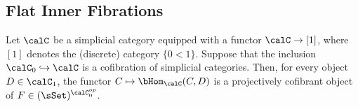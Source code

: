


\subsection{Flat Inner Fibrations}\label{flatinn}

\begin{lemma}\label{gooby}
Let $\calC$ be a simplicial category equipped with a functor
$\calC \rightarrow [1]$, where $[1]$ denotes the (discrete) category
$\{ 0 < 1 \}$. Suppose that the inclusion $\calC_0 \hookrightarrow \calC$
is a cofibration of simplicial categories. Then, for every object $D \in \calC_{1}$, the
functor $C \mapsto \bHom_{ \calC}( C, D)$ is a projectively cofibrant object of
$F \in (\sSet)^{\calC_0^{op}}$. 
\end{lemma}


